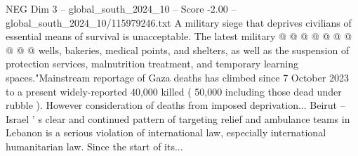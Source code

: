 \begin{textsample}{NEG Dim 3 – global\_south\_2024\_10 – Score -2.00 – global\_south\_2024\_10/115979246.txt}
A military siege that deprives civilians of essential means of survival is unacceptable.
The latest military @ @ @ @ @ @ @ @ @ @ wells, bakeries, medical points, and shelters, as well as the suspension of protection services, malnutrition treatment, and temporary learning spaces."Mainstream reportage of Gaza deaths has climbed since 7 October 2023 to a present widely-reported 40,000 killed ( 50,000 including those dead under rubble ).
However consideration of deaths from imposed deprivation...
Beirut -- Israel ' s clear and continued pattern of targeting relief and ambulance teams in Lebanon is a serious violation of international law, especially international humanitarian law.
Since the start of its...

\end{textsample}
